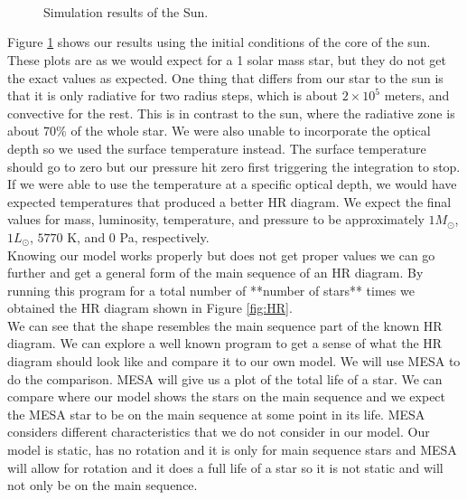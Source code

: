 \documentclass[10pt]{article}
\begin{document}
\begin{figure}[p]
\begin{centering}
 \begin{subfigure}{\textwidth}
  
 \end{subfigure} \\
 \begin{subfigure}{\textwidth}
  
 \end{subfigure} \\
  \begin{subfigure}{\textwidth}
  
 \end{subfigure} \\
   \begin{subfigure}{\textwidth}
  
 \end{subfigure}
 \caption{Simulation results of the Sun.}
 \label{fig:sun}
 \end{centering}
\end{figure}

Figure \ref{fig:sun} shows our results using the initial conditions of the core of the sun. These plots are as we would expect for a 1 solar mass star, but they do not get the exact values as expected. One thing that differs from our star to the sun is that it is only radiative for two radius steps, which is about $2\times 10^5$ meters, and convective for the rest. This is in contrast to the sun, where the radiative zone is about 70\% of the whole star. We were also unable to incorporate the optical depth so we used the surface temperature instead. The surface temperature should go to zero but our pressure hit zero first triggering the integration to stop. If we were able to use the temperature at a specific optical depth, we would have expected temperatures that produced a better HR diagram. We expect the final values for mass, luminosity, temperature, and pressure to be approximately $1 M_\odot$, $1 L_\odot$, $5770$ K, and $0$ Pa, respectively. \\

Knowing our model works properly but does not get proper values we can go further and get a general form of the main sequence of an HR diagram. By running this program for a total number of **number of stars** times we obtained the HR diagram shown in Figure \ref{fig:HR}. \\

We can see that the shape resembles the main sequence part of the known HR diagram. We can explore a well known program to get a sense of what the HR diagram should look like and compare it to our own model. We will use MESA to do the comparison. MESA will give us a plot of the total life of a star. We can compare where our model shows the stars on the main sequence and we expect the MESA star to be on the main sequence at some point in its life. MESA considers different characteristics that  we do not consider in our model. Our model is static, has no rotation and it is only for main sequence stars and MESA will allow for rotation and it does a full life of a star so it is not static and will not only be on the main sequence. \\ 
\end{document}

